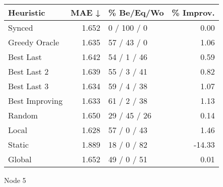 \begin{tabular}{lrlr}
\toprule
\textbf{Heuristic} & \textbf{MAE ↓} & \textbf{\% Be/Eq/Wo} & \textbf{\% Improv.} \\
\midrule
            Synced &          1.652 &          0 / 100 / 0 &                0.00 \\
     Greedy Oracle &          1.635 &          57 / 43 / 0 &                1.06 \\
         Best Last &          1.642 &          54 / 1 / 46 &                0.59 \\
       Best Last 2 &          1.639 &          55 / 3 / 41 &                0.82 \\
       Best Last 3 &          1.634 &          59 / 4 / 38 &                1.07 \\
    Best Improving &          1.633 &          61 / 2 / 38 &                1.13 \\
            Random &          1.650 &         29 / 45 / 26 &                0.14 \\
             Local &          1.628 &          57 / 0 / 43 &                1.46 \\
            Static &          1.889 &          18 / 0 / 82 &              -14.33 \\
            Global &          1.652 &          49 / 0 / 51 &                0.01 \\
\bottomrule
\end{tabular}
\caption{Node 5}
\label{tab:ds_non_lr01_le1_bs4_5}
